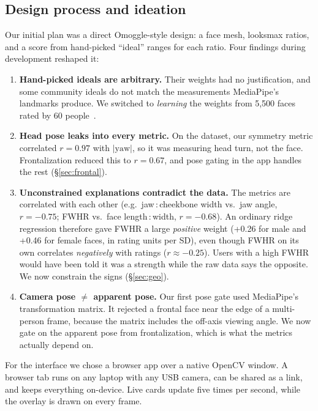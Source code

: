 \documentclass[sigconf,nonacm]{acmart}
\begin{document}
\subsection{Design process and ideation}
Our initial plan was a direct Omoggle-style design: a face mesh, looksmax ratios, and a score from
hand-picked ``ideal'' ranges for each ratio. Four findings during development reshaped it:
\begin{enumerate}[leftmargin=*,nosep]
  \item \textbf{Hand-picked ideals are arbitrary.} Their weights had no justification, and some community
        ideals do not match the measurements MediaPipe's landmarks produce. We switched to \emph{learning} the
        weights from 5,500 faces rated by 60 people~\cite{liang2018scut}.
  \item \textbf{Head pose leaks into every metric.} On the dataset, our symmetry metric correlated
        $r=0.97$ with $|\text{yaw}|$, so it was measuring head turn, not the face. Frontalization reduced
        this to $r=0.67$, and pose gating in the app handles the rest (\S\ref{sec:frontal}).
  \item \textbf{Unconstrained explanations contradict the data.} The metrics are correlated with each other
        (e.g.\ jaw\,:\,cheekbone width vs.\ jaw angle, $r=-0.75$; FWHR vs.\ face length\,:\,width, $r=-0.68$).
        An ordinary ridge regression therefore gave FWHR a large \emph{positive} weight (+0.26 for male and +0.46 for female
        faces, in rating units per SD), even though FWHR on its own correlates \emph{negatively} with
        ratings ($r\approx-0.25$). Users with a high FWHR would have been told it was a strength while the raw
        data says the opposite. We now constrain the signs (\S\ref{sec:geo}).
  \item \textbf{Camera pose $\neq$ apparent pose.} Our first pose gate used MediaPipe's transformation
        matrix. It rejected a frontal face near the edge of a multi-person frame, because the matrix includes
        the off-axis viewing angle. We now gate on the apparent pose from frontalization, which is what the
        metrics actually depend on.
\end{enumerate}
For the interface we chose a browser app over a native OpenCV window. A browser tab runs on any laptop
with any USB camera, can be shared as a link, and keeps everything on-device.
Live cards update five times per second, while the overlay is drawn on every frame.
\end{document}
